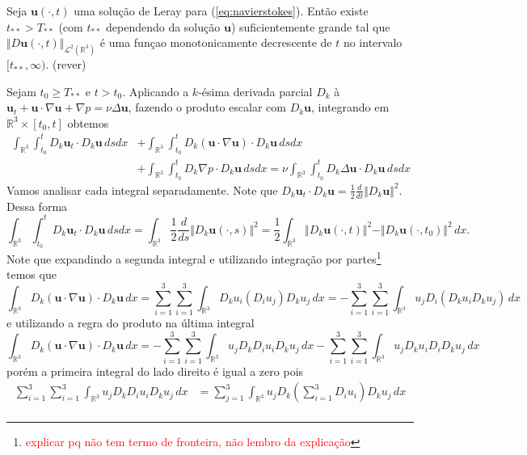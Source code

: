 \documentclass[a4paper, 11pt]{book}
\theoremstyle{definition}
\newcommand{\bR}{\mathbb{R}}
\newcommand{\bu}{\mathbf{u}}
\newcommand{\cL}{\mathcal{L}}
\begin{document}
\begin{pbox} \label{pr:tstar}
    Seja $\bu(\cdot,t)$ uma solução de Leray para (\ref{eq:navierstokes}). Então existe $t_{**} > T_{**}$ (com $t_{**}$ dependendo da solução $\bu$) suficientemente grande tal que $\Vert D\bu(\cdot,t) \Vert_{\cL^2(\bR^3)}$ é uma funçao monotonicamente decrescente de $t$ no intervalo $[t_{**}, \infty)$. (rever)
\end{pbox}
\begin{prf}
    Sejam $t_0 \geqslant T_{**}$ e $t > t_0$.
    Aplicando a $k$-ésima derivada parcial $D_k$ à $\bu_t + \bu \cdot \nabla \bu + \nabla p = \nu \Delta \bu$, fazendo o produto escalar com $D_k \bu$, integrando em $\bR^3 \times [t_0,t]$ obtemos
    \begin{equation} \label{eq:A}
        \begin{aligned}
            \int_{\bR^3} \int_{t_0}^t D_k \bu_t \cdot D_k \bu \,dsdx &+ \int_{\bR^3} \int_{t_0}^t D_k (\bu \cdot \nabla \bu) \cdot D_k \bu \,dsdx\\ 
            &+ \int_{\bR^3} \int_{t_0}^t D_k \nabla p \cdot D_k\bu \,dsdx = \nu \int_{\bR^3} \int_{t_0}^t D_k \Delta \bu \cdot D_k \bu \,dsdx
        \end{aligned}
    \end{equation}
    Vamos analisar cada integral separadamente.
    Note que $D_k \bu_t \cdot D_k \bu = \frac{1}{2} \frac{d}{dt} \Vert D_k \bu \Vert^2$.
    Dessa forma 
    \[
        \int_{\bR^3} \int_{t_0}^t D_k \bu_t \cdot D_k \bu \,dsdx = \int_{\bR^3} \frac{1}{2} \frac{d}{ds} \Vert D_k \bu(\cdot,s) \Vert^2 =  \frac{1}{2} \int_{\bR^3} \Vert D_k \bu(\cdot,t) \Vert^2 -  \Vert D_k \bu(\cdot,t_0) \Vert^2 \,dx.
    \]
    Note que expandindo a segunda integral e utilizando integração por partes\footnote{\textcolor{red}{explicar pq não tem termo de fronteira, não lembro da explicação}} temos que
    \[
        \int_{\bR^3} D_k ( \bu \cdot \nabla \bu) \cdot D_k \bu \,dx = \sum_{i=1}^3 \sum_{i=1}^3 \int_{\bR^3} D_k u_i (D_i u_j) D_k u_j \,dx = -\sum_{i=1}^3 \sum_{i=1}^3 \int_{\bR^3} u_j D_i (D_k u_i D_k u_j) \,dx
    \]
    e utilizando a regra do produto na última integral
    \[
        \int_{\bR^3} D_k ( \bu \cdot \nabla \bu) \cdot D_k \bu \,dx = -\sum_{i=1}^3 \sum_{i=1}^3 \int_{\bR^3} u_j D_k D_i u_i D_k u_j \,dx -\sum_{i=1}^3 \sum_{i=1}^3 \int_{\bR^3} u_j D_k u_i D_i D_k u_j \,dx
    \]
    porém a primeira integral do lado direito é igual a zero pois
    \[
        \begin{aligned}
            \sum_{i=1}^3 \sum_{i=1}^3 \int_{\bR^3} u_j D_k D_i u_i D_k u_j \,dx &= \sum_{j=1}^3 \int_{\bR^3}  u_j D_k \left( \sum_{i=1}^3 D_i u_i \right) D_k u_j  \,dx\\

\end{aligned}\]
\end{prf}
\end{document}
